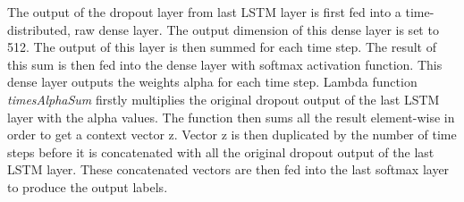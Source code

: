 The output of the dropout layer from last LSTM layer is first fed into a time-distributed, raw dense layer. The output dimension of this dense layer is set to 512. The output of this layer is then summed for each time step. The result of this sum is then fed into the dense layer with softmax activation function. This dense layer outputs the weights alpha for each time step. Lambda function \textit{timesAlphaSum} firstly multiplies the original dropout output of the last LSTM layer with the alpha values. The function then sums all the result element-wise in order to get a context vector z. Vector z is then duplicated by the number of time steps before it is concatenated with all the original dropout output of the last LSTM layer. These concatenated vectors are then fed into the last softmax layer to produce the output labels.

%

